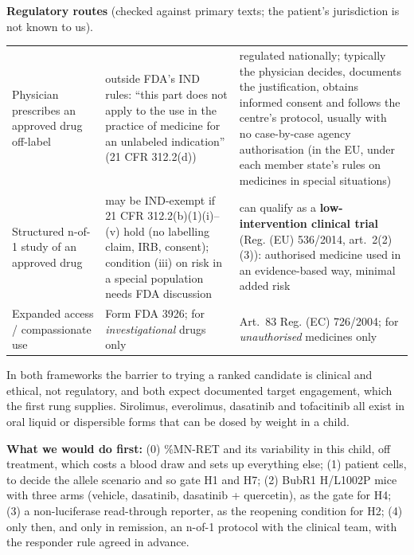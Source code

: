 \documentclass[10pt]{article}
\begin{document}
\textbf{Regulatory routes} (checked against primary texts; the patient's jurisdiction is not known to us).
\begin{table}[H]\tablefont
\begin{tabularx}{\linewidth}{@{}P{3.3cm}LL@{}}
\toprule{} &  & \\\midrule
Physician prescribes an approved drug off-label & outside FDA's IND rules: ``this part does not apply to the use in the practice of medicine for an unlabeled indication'' (21 CFR 312.2(d)) & regulated nationally; typically the physician decides, documents the justification, obtains informed consent and follows the centre's protocol, usually with no case-by-case agency authorisation (in the EU, under each member state's rules on medicines in
special situations)\\
Structured n-of-1 study of an approved drug & may be IND-exempt if 21 CFR 312.2(b)(1)(i)–(v) hold (no labelling claim, IRB, consent); condition (iii) on risk in a special population needs FDA discussion & can qualify as a \textbf{low-intervention clinical trial} (Reg. (EU) 536/2014, art.~2(2)(3)): authorised medicine used in an evidence-based way, minimal added risk\\
Expanded access / compassionate use & Form FDA 3926; for \textit{investigational} drugs only & Art.~83 Reg. (EC) 726/2004; for \textit{unauthorised} medicines only\\\bottomrule
\end{tabularx}\end{table}
In both frameworks the barrier to trying a ranked candidate is clinical and ethical, not regulatory, and both expect
documented target engagement, which the first rung supplies. Sirolimus, everolimus, dasatinib and tofacitinib all
exist in oral liquid or dispersible forms that can be dosed by weight in a child.

\textbf{What we would do first:} (0) \%MN-RET and its variability in this child, off treatment, which costs a blood
draw and sets up everything else; (1) patient cells, to decide the allele scenario and so gate H1 and H7;
(2) BubR1 H/L1002P mice with three arms (vehicle, dasatinib, dasatinib + quercetin), as the gate for H4; (3) a
non-luciferase read-through reporter, as the reopening condition for H2; (4) only then, and only in remission, an
n-of-1 protocol with the clinical team, with the responder rule agreed in advance.
\end{document}

